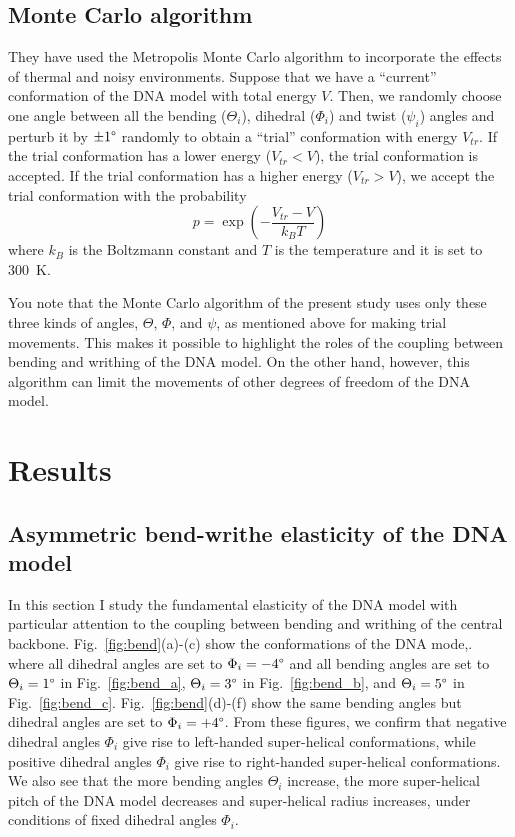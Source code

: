 \documentclass[a4paper,10pt]{article}
\begin{document}
\subsection{Monte Carlo algorithm}
They have used the Metropolis Monte Carlo algorithm to incorporate the effects of thermal and noisy environments.
Suppose that we have a ``current'' conformation of the DNA model with total energy $V$.
Then, we randomly choose one angle between all the bending ($\Theta_i$), dihedral ($\Phi_i$) and twist ($\psi_i$) angles and perturb it by $\pm1\degree$ randomly to obtain a ``trial'' conformation with energy $V_{tr}$.
If the trial conformation has a lower energy ($V_{tr}<V$), the trial conformation is accepted.
If the trial conformation has a higher energy ($V_{tr}>V$), we accept the trial conformation with the probability
\begin{equation}\label{eq:prob}
p=\exp{\left(-\dfrac{V_{tr}-V}{k_{B}T}\right)}
\end{equation}
where $k_{B}$ is the Boltzmann constant and $T$ is the temperature and it is set to \SI{300}{\kelvin}.

You note that the Monte Carlo algorithm of the present study uses only these three kinds of angles, $\Theta$, $\Phi$, and $\psi$, as mentioned above for making trial movements.
This makes it possible to highlight the roles of the coupling between bending and writhing of the DNA model.
On the other hand, however, this algorithm can limit the movements of other degrees of freedom of the DNA model.

\section{Results}
\subsection{Asymmetric bend-writhe elasticity of the DNA model}\label{sec:bend_writh}
In this section I study the fundamental elasticity of the DNA model with particular attention to the coupling between bending and writhing of the central backbone.
Fig.~\ref{fig:bend}(a)-(c) show the conformations of the DNA mode,. where all dihedral angles are set to $\Phi_i=-4\degree$ and all bending angles are set to $\Theta_i=1\degree$ in Fig.~\ref{fig:bend_a}, $\Theta_i=3\degree$ in Fig.~\ref{fig:bend_b}, and $\Theta_i=5\degree$ in  Fig.~\ref{fig:bend_c}.
Fig.~\ref{fig:bend}(d)-(f) show the same bending angles but dihedral angles are set to $\Phi_i=+4\degree$.
From these figures, we confirm that negative dihedral angles $\Phi_i$ give rise to left-handed super-helical conformations, while positive dihedral angles $\Phi_i$ give rise to right-handed super-helical conformations.
We also see that the more bending angles $\Theta_i$ increase, the more super-helical pitch of the DNA model decreases and super-helical radius increases, under conditions of fixed dihedral angles $\Phi_i$.
\end{document}
